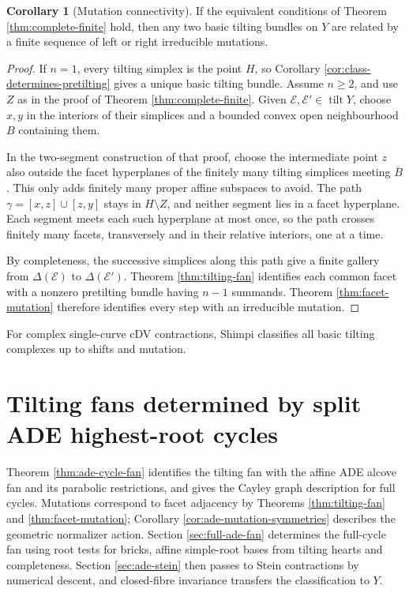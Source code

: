\documentclass[a4paper,reqno]{amsart}
\def\E{\mathcal{E}}
\DeclareMathOperator{\tilt}{tilt}
\theoremstyle{definition}
\newtheorem{Cor}[Thm]{Corollary}
\begin{document}
\begin{Cor}[Mutation connectivity]\label{cor:complete-mutation-connectivity}
If the equivalent conditions of Theorem \ref{thm:complete-finite} hold, then any two basic tilting bundles on $Y$ are related by a finite sequence of left or right irreducible mutations.
\end{Cor}
\begin{proof}
If $n=1$, every tilting simplex is the point $H$, so Corollary \ref{cor:class-determines-pretilting} gives a unique basic tilting bundle. Assume $n\ge2$, and use $Z$ as in the proof of Theorem \ref{thm:complete-finite}. Given $\E,\E'\in\tilt Y$, choose $x,y$ in the interiors of their simplices and a bounded convex open neighbourhood $B$ containing them.

In the two-segment construction of that proof, choose the intermediate point $z$ also outside the facet hyperplanes of the finitely many tilting simplices meeting $\overline B$. This only adds finitely many proper affine subspaces to avoid. The path $\gamma=[x,z]\cup[z,y]$ stays in $H\setminus Z$, and neither segment lies in a facet hyperplane. Each segment meets each such hyperplane at most once, so the path crosses finitely many facets, transversely and in their relative interiors, one at a time.

By completeness, the successive simplices along this path give a finite gallery from $\Delta(\E)$ to $\Delta(\E')$. Theorem \ref{thm:tilting-fan} identifies each common facet with a nonzero pretilting bundle having $n-1$ summands. Theorem \ref{thm:facet-mutation} therefore identifies every step with an irreducible mutation.
\end{proof}

For complex single-curve cDV contractions, Shimpi \cite[Theorem 3.2]{Shi25} classifies all basic tilting complexes up to shifts and mutation.

\section{Tilting fans determined by split ADE highest-root cycles}\label{sec:ade-fibres}

Theorem \ref{thm:ade-cycle-fan} identifies the tilting fan with the affine ADE alcove fan and its parabolic restrictions, and gives the Cayley graph description for full cycles. Mutations correspond to facet adjacency by Theorems \ref{thm:tilting-fan} and \ref{thm:facet-mutation}; Corollary \ref{cor:ade-mutation-symmetries} describes the geometric normalizer action. Section \ref{sec:full-ade-fan} determines the full-cycle fan using root tests for bricks, affine simple-root bases from tilting hearts and completeness. Section \ref{sec:ade-stein} then passes to Stein contractions by numerical descent, and closed-fibre invariance transfers the classification to $Y$.
\end{document}
